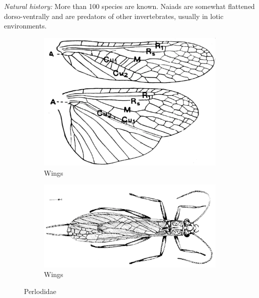 \documentclass[letterpaper, 11pt]{article}
\begin{document}
\noindent{}\textit{Natural history:} More than 100 species are known. Naiads are somewhat flattened dorso-ventrally and are predators of other invertebrates, usually in lotic environments.\\

\begin{figure}[ht!]
    \centering
    \begin{subfigure}[ht!]{0.4\textwidth}
        \includegraphics[width=\textwidth]{PerlodidWings}
        \caption{Wings \citep[modified from][Plate 9, Fig. 1]{bhl29875}}
        \label{fig:perlodid1}
    \end{subfigure}
    \qquad
    \begin{subfigure}[ht!]{0.5\textwidth}
        \includegraphics[width=\textwidth]{PerlodidHabitus}
        \caption{Wings \citep[modified from][Fig. 12]{bhl29875}}
        \label{fig:perlodid2}
    \end{subfigure}
    \caption{Perlodidae}\label{fig:perlodids}
\end{figure}
\end{document}
